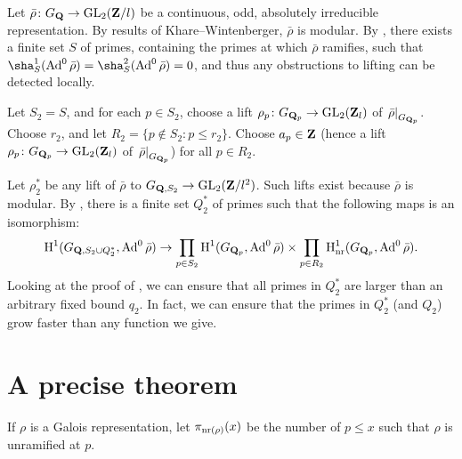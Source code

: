 Let $\bar\rho\colon G_{\mathbf{Q}} \to \operatorname{GL}_2(\mathbf{Z}/l)$ be a continuous, odd, absolutely 
irreducible representation. By results of Khare--Wintenberger, $\bar\rho$ is 
modular. By \cite[Lem.~6]{khare-larsen-ramakrishna-2005}, there exists a finite 
set $S$ of primes, containing the primes at which $\bar\rho$ ramifies, such 
that $\sha_S^1(\Ad^0\bar\rho) = \sha_S^2(\Ad^0\bar\rho) = 0$, and thus any 
obstructions to lifting can be detected locally. 

Let $S_2=S$, and for each $p\in S_2$, choose a lift 
$\rho_p\colon G_{\mathbf{Q}_p} \to \operatorname{GL}_2(\mathbf{Z}_l)$ of 
$\left.\bar\rho\right|_{G_{\mathbf{Q}_p}}$. Choose $r_2$, and let 
$R_2 = \{p\notin S_2 : p\leqslant r_2\}$. Choose $a_p\in \mathbf{Z}$ (hence a lift 
$\rho_p\colon G_{\mathbf{Q}_p} \to \operatorname{GL}_2(\mathbf{Z}_l)$ of 
$\left.\bar\rho\right|_{G_{\mathbf{Q}_p}}$) for all $p\in R_2$. 

Let $\rho_2^\ast$ be any lift of $\bar\rho$ to 
$G_{\mathbf{Q},S_2} \to \operatorname{GL}_2(\mathbf{Z}/l^2)$. Such lifts exist because $\bar\rho$ is 
modular. By \cite[Lem.~8]{khare-larsen-ramakrishna-2005}, there is a finite set $Q_2^\ast$ of primes such that the following maps is an isomorphism:
\[
	\operatorname{H}^1(G_{\mathbf{Q},S_2\cup Q_2^\ast},\operatorname{Ad}^0\bar\rho) 
		\to \prod_{p\in S_2} \operatorname{H}^1(G_{\mathbf{Q}_p},\operatorname{Ad}^0\bar\rho)\times \prod_{p\in R_2} \operatorname{H}^1_{\mathrm{nr}}(G_{\mathbf{Q}_p},\operatorname{Ad}^0\bar\rho) .
\]
Looking at the proof of \cite[Fact 5]{khare-larsen-ramakrishna-2005}, we can 
ensure that all primes in $Q_2^\ast$ are larger than an arbitrary fixed bound 
$q_2$. In fact, we can ensure that the primes in $Q_2^\ast$ (and $Q_2$) grow 
faster than any function we give. 





\section{A precise theorem}

If $\rho$ is a Galois representation, let $\pi_{\mathrm{nr}(\rho)}(x)$ be the number of 
$p\leqslant x$ such that $\rho$ is unramified at $p$. 

